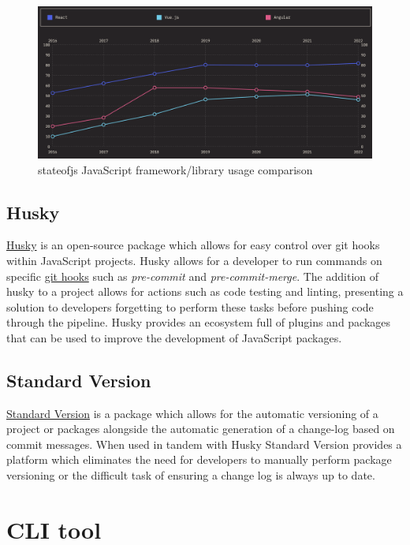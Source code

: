 \documentclass{l4proj}
\begin{document}
\begin{figure}[!ht]
    \centering
    \includegraphics[width=13cm]{dissertation/images/framework_popularity_comparison.png}
    \caption{stateofjs JavaScript framework/library usage comparison}
    \label{fig:js_framework_lib_comp}
\end{figure}

\subsection{Husky}
\href{https://typicode.github.io/husky/#/}{Husky} is an open-source package which allows for easy control over git hooks within JavaScript projects. Husky allows for a developer to run commands on specific \href{https://git-scm.com/docs/githooks}{git hooks} such as \textit{pre-commit} and \textit{pre-commit-merge}. The addition of husky to a project allows for actions such as code testing and linting, presenting a solution to developers forgetting to perform these tasks before pushing code through the pipeline. Husky provides an ecosystem full of plugins and packages that can be used to improve the development of JavaScript packages.

\subsection{Standard Version}
\href{https://github.com/conventional-changelog/standard-version#readme}{Standard Version} is a package which allows for the automatic versioning of a project or packages alongside the automatic generation of a change-log based on commit messages. When used in tandem with Husky Standard Version provides a platform which eliminates the need for developers to manually perform package versioning or the difficult task of ensuring a change log is always up to date.

\section{CLI tool}
\end{document}

